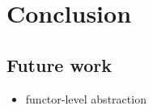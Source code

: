 \chapter{Conclusion}
\label{chapter:conclusion}

\section{Future work}

\begin{itemize}
\item functor-level abstraction
\end{itemize}
